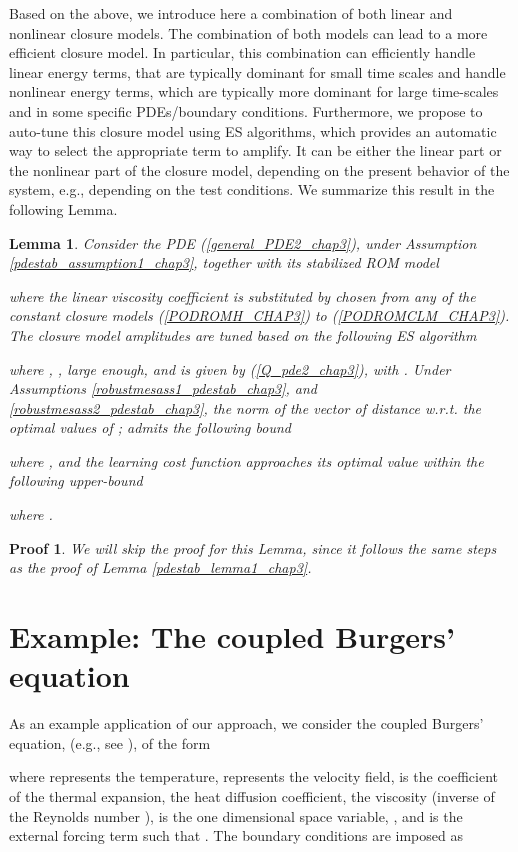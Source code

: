 \documentclass[letterpaper,conference,onecolumn,11pt]{IEEEtran}
\newtheorem{lemma}{Lemma}
\newtheorem{pf}{Proof}
\begin{document}
Based on the above, we introduce here a combination of both linear and
nonlinear closure models. The combination of both models can lead to a
more efficient closure model. In particular, this combination can
efficiently handle linear energy terms, that are typically dominant
for small time scales and handle nonlinear energy terms, which are
typically more dominant for large time-scales and in some specific
PDEs/boundary conditions. Furthermore, we propose to auto-tune this
closure model using ES algorithms, which provides an automatic way to
select the appropriate term to amplify. It can be either the linear
part or the nonlinear part of the closure model, depending on the
present behavior of the system, e.g., depending on the test
conditions.  We summarize this result in the following Lemma.


\begin{lemma}\label{pdestab_lemma2_chap3}
Consider the PDE (\ref{general_PDE2_chap3}), under Assumption
\ref{pdestab_assumption1_chap3}, together with its stabilized ROM
model

 where the linear viscosity coefficient
 is substituted by  chosen from any of the
constant closure models (\ref{PODROMH_CHAP3}) to
(\ref{PODROMCLM_CHAP3}). The closure model amplitudes
 are tuned based on the following ES algorithm

where ,
,
 large enough, and  is given by
(\ref{Q_pde2_chap3}), with
. Under Assumptions
\ref{robustmesass1_pdestab_chap3}, and
\ref{robustmesass2_pdestab_chap3}, the norm of the vector of
distance w.r.t. the optimal values of ;
  admits the following bound

where , and the learning cost
function approaches its optimal value within the following
upper-bound

where
.
\end{lemma}
\begin{pf}
We will skip the proof for this Lemma, since it follows the same
steps as the proof of Lemma \ref{pdestab_lemma1_chap3}.
\end{pf}


\section{Example: The coupled Burgers' equation}
\label{Burgers-example}
As an example application of our approach, we consider the coupled
Burgers' equation, (e.g., see \cite{B_master_011}), of the form

where  represents the temperature,
 represents the velocity field,  is the
coefficient of the thermal expansion,  the heat diffusion
coefficient,  the viscosity (inverse of the Reynolds number
),  is the one dimensional space variable, ,
and  is the external forcing term such that . The boundary conditions are
imposed as
\end{document}
